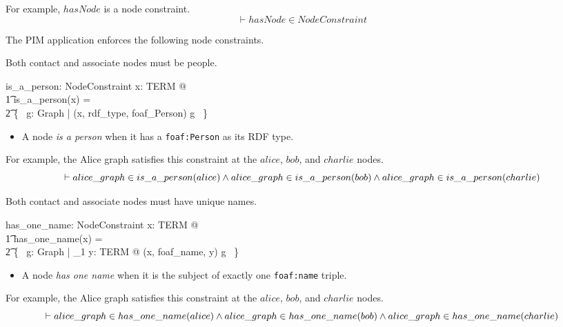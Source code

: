 \documentclass{article}
\begin{document}
For example, $hasNode$ is a node constraint.
\[\vdash
	hasNode \in NodeConstraint
\]

The PIM application enforces the following node constraints.

Both contact and associate nodes must be people.
\begin{axdef}
	is\_a\_person: NodeConstraint
\where
	\forall x: TERM @ \\
\t1		is\_a\_person(x) = \\
\t2		\{~ g: Graph | (x, rdf\_type, foaf\_Person) \in g ~\}
\end{axdef}
\begin{itemize}
\item A node {\em is a person} when it has a {\tt foaf:Person} as its RDF type.
\end{itemize}

For example, the Alice graph satisfies this constraint at the $alice$, $bob$, and $charlie$ nodes.
\[\vdash
	alice\_graph \in is\_a\_person(alice) \land \\
	alice\_graph \in is\_a\_person(bob) \land \\
	alice\_graph \in is\_a\_person(charlie)
\]

Both contact and associate nodes must have unique names.
\begin{axdef}
	has\_one\_name: NodeConstraint
\where
	\forall x: TERM @ \\
\t1		has\_one\_name(x) = \\
\t2			\{~ g: Graph | \exists_1 y: TERM @ (x, foaf\_name, y) \in g ~\}
\end{axdef}
\begin{itemize}
\item A node {\em has one name} when it is the subject of exactly one {\tt foaf:name} triple.
\end{itemize}

For example, the Alice graph satisfies this constraint at the $alice$, $bob$, and $charlie$ nodes.
\[\vdash
	alice\_graph \in has\_one\_name(alice) \land \\
	alice\_graph \in has\_one\_name(bob) \land \\
	alice\_graph \in has\_one\_name(charlie)
\]
\end{document}
